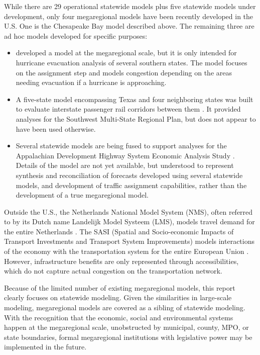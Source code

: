 While there are 29 operational statewide models plus five statewide models under development, only four megaregional models have been recently developed in the U.S. One is the Chesapeake Bay model described above. The remaining three are ad hoc models developed for specific purposes:
\begin{itemize}
\item \cite{zhang13} developed a model at the megaregional scale, but it is only intended for hurricane evacuation analysis of several southern states. The model focuses on the assignment step and models congestion depending on the areas needing evacuation if a hurricane is approaching.
\item A five-state model encompassing Texas and four neighboring states was built to evaluate interstate passenger rail corridors between them \citep{meyer15}. It provided analyses for the Southwest Multi-State Regional Plan, but does not appear to have been used otherwise.
\item Several statewide models are being fused to support analyses for the Appalachian Development Highway System Economic Analysis Study \citep{edrg16}. Details of the model are not yet available, but understood to represent synthesis and reconciliation of forecasts developed using several statewide models, and development of traffic assignment capabilities, rather than the development of a true megaregional model.
\end{itemize}

Outside the U.S., the Netherlands National Model System (NMS), often referred to by its Dutch name Landelijk Model Systeem (LMS), models travel demand for the entire Netherlands \citep{gunn94}. The SASI (Spatial and Socio-economic Impacts of Transport Investments and Transport System Improvements) models interactions of the economy with the transportation system for the entire European Union \citep{wegener08}. However, infrastructure benefits are only represented through accessibilities, which do not capture actual congestion on the transportation network.

Because of the limited number of existing megaregional models, this report clearly focuses on statewide modeling. Given the similarities in large-scale modeling, megaregional models are covered as a sibling of statewide modeling. With the recognition that the economic, social and environmental systems happen at the megaregional scale, unobstructed by municipal, county, MPO, or state boundaries, formal megaregional institutions with legislative power may be implemented in the future.

